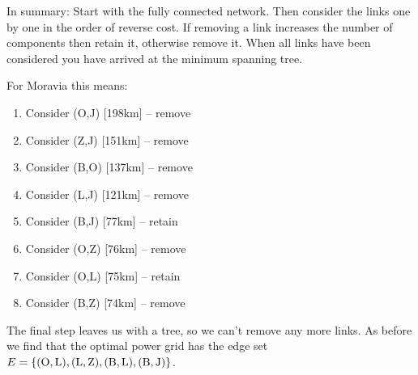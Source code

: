 In summary: Start with the fully connected network. Then consider the links one by one in the order of reverse cost. If removing a link increases the number of components then retain it, otherwise remove it. When all links have been considered you have arrived at the minimum spanning tree.    

\pagebreak\noindent
For Moravia this means:
\begin{enumerate}[label=\arabic*.]
\item Consider (O,J) [198km] -- remove 
\item Consider (Z,J) [151km] -- remove
\item Consider (B,O) [137km] -- remove
\item Consider (L,J) [121km] -- remove
\item Consider (B,J) [77km] -- retain
\item Consider (O,Z) [76km] -- remove
\item Consider (O,L) [75km] -- retain
\item Consider (B,Z) [74km] -- remove
 \end{enumerate}
The final step leaves us with a tree, so we can't remove any more links. As before we find that the optimal power grid has the edge set $E=\{{\rm(O,L),(L,Z),(B,L),(B,J) }\}$.
